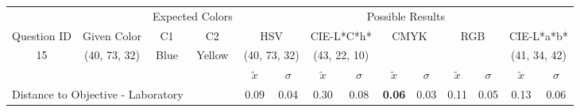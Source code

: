 \begin{table}[H]
  \resizebox{\textwidth}{!} {
  \begin{tabular}{lccccccccccccc}
    \hline
    \multicolumn{1}{c}{}                              &                                      & \multicolumn{2}{c}{Expected Colors}                   & \multicolumn{10}{c}{Possible Results}                                                                                                                                                                                                                                                                                        \\ \cline{3-14}
    \multicolumn{1}{c}{\multirow{-2}{*}{Question ID}} & \multirow{-2}{*}{Given Color}        & C1                       & C2                         & \multicolumn{2}{c}{HSV}                                        & \multicolumn{2}{c}{CIE-L*C*h*}                                 & \multicolumn{2}{c}{CMYK}                                       & \multicolumn{2}{c}{RGB}                                        & \multicolumn{2}{c}{CIE-L*a*b*}                                 \\ \hline
    \multicolumn{1}{c}{15}                             & \cellcolor[HTML]{00FF80}(40, 73, 32) & \multicolumn{1}{c|}{Blue} & \multicolumn{1}{c|}{Yellow}  & \multicolumn{2}{c|}{\cellcolor[HTML]{00FF80}(40, 73, 32)}      & \multicolumn{2}{c|}{\cellcolor[HTML]{FF0050}(43, 22, 10)}       & \multicolumn{2}{c|}{\cellcolor[HTML]{808080}{\color[HTML]{FFFFFF}(21, 22, 24)}}       & \multicolumn{2}{c|}{\cellcolor[HTML]{808080}{\color[HTML]{FFFFFF}(21, 22, 24)}}       & \multicolumn{2}{c|}{\cellcolor[HTML]{CA8AAA}(41, 34, 42)}       \\ \hline
                                                      & \multicolumn{1}{l}{}                 & \multicolumn{1}{l}{}     & \multicolumn{1}{l}{}       & \multicolumn{1}{c}{$\tilde{x}$} & \multicolumn{1}{c}{$\sigma$} & \multicolumn{1}{c}{$\tilde{x}$} & \multicolumn{1}{c}{$\sigma$} & \multicolumn{1}{c}{$\tilde{x}$} & \multicolumn{1}{c}{$\sigma$} & \multicolumn{1}{c}{$\tilde{x}$} & \multicolumn{1}{c}{$\sigma$} & \multicolumn{1}{c}{$\tilde{x}$} & \multicolumn{1}{c}{$\sigma$} \\ \hline
    \multicolumn{4}{l}{Distance to Objective - Laboratory}                                                                                           & \multicolumn{1}{|c}{0.09}       & \multicolumn{1}{c|}{0.04}    & \multicolumn{1}{|c}{0.30}       & \multicolumn{1}{c|}{0.08}    & \multicolumn{1}{|c}{\textbf{0.06}}       & \multicolumn{1}{c|}{0.03}    & \multicolumn{1}{|c}{0.11}       & \multicolumn{1}{c|}{0.05}    & \multicolumn{1}{|c}{0.13}       & \multicolumn{1}{c|}{0.06}    \\

\end{tabular}}
\end{table}
